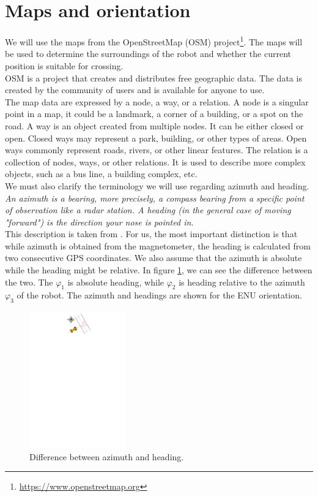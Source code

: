 \section{Maps and orientation}
    We will use the maps from the OpenStreetMap (OSM) project\footnote{\url{https://www.openstreetmap.org}}. The maps will be used to determine the surroundings of the robot and whether the current position is suitable for crossing.\\
    OSM is a project that creates and distributes free geographic data. The data is created by the community of users and is available for anyone to use.\cite{OSMwiki}\\
    The map data are expressed by a node, a way, or a relation. A node is a singular point in a map, it could be a landmark, a corner of a building, or a spot on the road. A way is an object created from multiple nodes. It can be either closed or open. Closed ways may represent a park, building, or other types of areas. Open ways commonly represent roads, rivers, or other linear features. The relation is a collection of nodes, ways, or other relations. It is used to describe more complex objects, such as a bus line, a building complex, etc.\\
    We must also clarify the terminology we will use regarding azimuth and heading.\\
    \emph{An azimuth is a bearing, more precisely, a compass bearing from a specific point of observation like a radar station. A heading (in the general case of moving "forward") is the direction your nose is pointed in.}\\
    This description is taken from \cite{heading}. For us, the most important distinction is that while azimuth is obtained from the magnetometer, the heading is calculated from two consecutive GPS coordinates. We also assume that the azimuth is absolute while the heading might be relative. In figure \ref{fig:azi_head}, we can see the difference between the two. The $\varphi_{1}$ is absolute heading, while $\varphi_{2}$ is heading relative to the azimuth $\varphi_{3}$ of the robot. The azimuth and headings are shown for the ENU orientation.
    \begin{figure}[H]
        \centering
        \includegraphics[trim={0 27 0 0}, clip, height=5.9cm]{images/heading.pdf}
        \caption{Difference between azimuth and heading.}
        \label{fig:azi_head}
    \end{figure}
